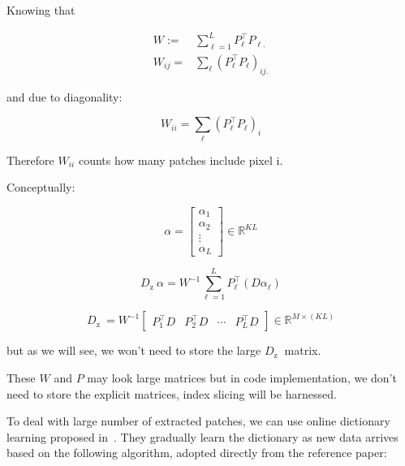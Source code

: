 \documentclass{article}
\theoremstyle{definition}
\begin{document}
Knowing that

$$
\begin{aligned}
W:= & \sum_{\ell=1}^L P_{\ell}^{\top} P_{\ell .} \\
W_{i j}= & \sum_{\ell}\left(P_{\ell}^{\top} P_{\ell}\right)_{i j .}
\end{aligned}
$$

and due to diagonality:

$$
W_{i i}=\sum_{\ell}\left(P_{\ell}^{\top} P_{\ell}\right)_i
$$

Therefore $W_{i i}$ counts how many patches include pixel i.


Conceptually:


$$
\alpha=\left[\begin{array}{c}
\alpha_1 \\
\alpha_2 \\
\vdots \\
\alpha_L
\end{array}\right] \in \mathbb{R}^{K L}
$$

$$
D_{\text {z }} \alpha=W^{-1} \sum_{\ell=1}^L P_{\ell}^{\top}\left(D \alpha_{\ell}\right)
$$

$$
D_{\text {z }}=W^{-1}\left[\begin{array}{llll}
P_1^{\top} D & P_2^{\top} D & \cdots & P_L^{\top} D
\end{array}\right] \in \mathbb{R}^{M \times(K L)}
$$

but as we will see, we won't need to store the large $D_{\text {z }}$ matrix.





These $W$ and $P$ may look large matrices but in code implementation, we don't need to store the explicit matrices, index slicing will be harnessed.

To deal with large number of extracted patches, we can use online dictionary learning proposed in~\cite{OnlineDLearn}. They gradually learn the dictionary as new data arrives based on the following algorithm, adopted directly from the reference paper:
\end{document}
